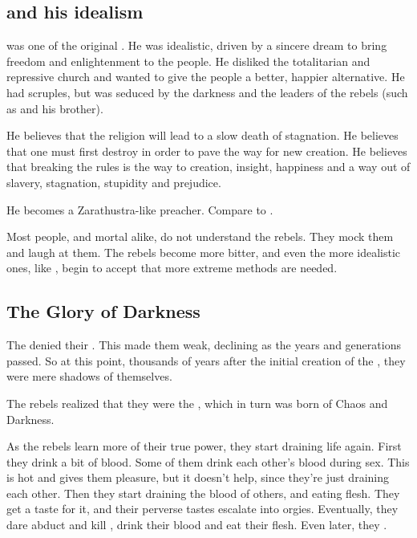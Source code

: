 \subsection[Sithiyacan and his idealism]{\Sithiyacaan{} and his idealism}
\Sithiyacaan{} was one of the original . He was idealistic, driven by a sincere dream to bring freedom and enlightenment to the \resphan{} people. He disliked the totalitarian and repressive \Merkyran{} church and wanted to give the people a better, happier alternative. He had scruples, but was seduced by the darkness and the leaders of the rebels (such as  and his brother). 

He believes that the \Merkyran{} religion will lead to a slow death of stagnation. 
He believes that one must first destroy in order to pave the way for new creation. 
He believes that breaking the rules is the way to creation, insight, happiness and a way out of slavery, stagnation, stupidity and prejudice.

He becomes a Zarathustra-like preacher. Compare to . 

Most people, \resphan{} and mortal alike, do not understand the rebels. They mock them and laugh at them. The rebels become more bitter, and even the more idealistic ones, like \Sithiyacaan, begin to accept that more extreme methods are needed. 









\subsection{The Glory of Darkness}
The \Merkyrans{} denied their . This made them weak, declining as the years and generations passed. So at this point, thousands of years after the initial creation of the \resphain, they were mere shadows of themselves.

The rebels realized that they were the , which in turn was born of Chaos and Darkness. 

As the rebels learn more of their true power, they start draining life again. First they drink a bit of blood. Some of them drink each other's blood during sex. This is hot and gives them pleasure, but it doesn't help, since they're just draining each other. Then they start draining the blood of others, and eating \human{} flesh. They get a taste for it, and their perverse tastes escalate into orgies. Eventually, they dare abduct and kill \resphain{}, drink their blood and eat their flesh. 
Even later, they . 

